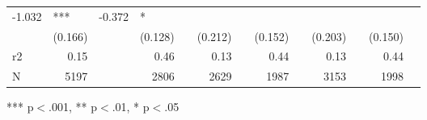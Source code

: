 \documentclass{article}
\begin{document}
\begin{table}[!h]
\begin{tabular}{lllllllllllll}
  \multicolumn{1}{r}{-1.032} &
  \multicolumn{1}{l}{***} &
  \multicolumn{1}{r}{-0.372} &
  \multicolumn{1}{l}{*} \\
\multicolumn{1}{l}{} &
  \multicolumn{1}{r}{(0.166)} &
  \multicolumn{1}{l}{} &
  \multicolumn{1}{r}{(0.128)} &
  \multicolumn{1}{l}{} &
  \multicolumn{1}{r}{(0.212)} &
  \multicolumn{1}{l}{} &
  \multicolumn{1}{r}{(0.152)} &
  \multicolumn{1}{l}{} &
  \multicolumn{1}{r}{(0.203)} &
  \multicolumn{1}{l}{} &
  \multicolumn{1}{r}{(0.150)} &
  \multicolumn{1}{l}{} \\
\multicolumn{1}{l}{r2} &
  \multicolumn{1}{r}{0.15} &
  \multicolumn{1}{l}{} &
  \multicolumn{1}{r}{0.46} &
  \multicolumn{1}{l}{} &
  \multicolumn{1}{r}{0.13} &
  \multicolumn{1}{l}{} &
  \multicolumn{1}{r}{0.44} &
  \multicolumn{1}{l}{} &
  \multicolumn{1}{r}{0.13} &
  \multicolumn{1}{l}{} &
  \multicolumn{1}{r}{0.44} &
  \multicolumn{1}{l}{} \\
\multicolumn{1}{l}{N} &
  \multicolumn{1}{r}{5197} &
  \multicolumn{1}{l}{} &
  \multicolumn{1}{r}{2806} &
  \multicolumn{1}{l}{} &
  \multicolumn{1}{r}{2629} &
  \multicolumn{1}{l}{} &
  \multicolumn{1}{r}{1987} &
  \multicolumn{1}{l}{} &
  \multicolumn{1}{r}{3153} &
  \multicolumn{1}{l}{} &
  \multicolumn{1}{r}{1998} &
  \multicolumn{1}{l}{} \\
\cline{1-13}
\end{tabular}

\footnotesize{
*** p$<$.001, ** p$<$.01, * p$<$.05
}
\end{table}
\end{document}
